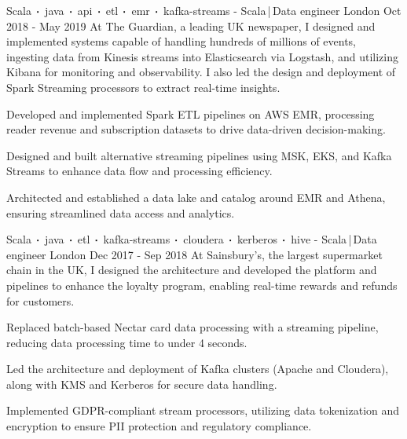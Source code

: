\begin{cventries}
    \cventry
    {Scala$\sqbig$java$\sqbig$api$\sqbig$etl$\sqbig$emr$\sqbig$kafka-streams}
    { - Scala\,|\,Data engineer}
    {London}
    {Oct 2018 - May 2019}
    {At The Guardian, a leading UK newspaper, I designed and implemented systems capable of handling hundreds of millions of events, ingesting data from Kinesis streams into Elasticsearch via Logstash, and utilizing Kibana for monitoring and observability. I also led the design and deployment of Spark Streaming processors to extract real-time insights.}
    {
        \begin{cvitems}
            \item{Developed and implemented Spark ETL pipelines on AWS EMR, processing reader revenue and subscription datasets to drive data-driven decision-making.}
            \item{Designed and built alternative streaming pipelines using MSK, EKS, and Kafka Streams to enhance data flow and processing efficiency.}
            \item{Architected and established a data lake and catalog around EMR and Athena, ensuring streamlined data access and analytics.}
        \end{cvitems}
    }

    \cventry
    {Scala$\sqbig$java$\sqbig$etl$\sqbig$kafka-streams$\sqbig$cloudera$\sqbig$kerberos$\sqbig$hive}
    { - Scala\,|\,Data engineer}
    {London}
    {Dec 2017 - Sep 2018}
    {At Sainsbury’s, the largest supermarket chain in the UK, I designed the architecture and developed the platform and pipelines to enhance the loyalty program, enabling real-time rewards and refunds for customers.}
    {
        \begin{cvitems}
            \item{Replaced batch-based Nectar card data processing with a streaming pipeline, reducing data processing time to under 4 seconds.}
            \item{Led the architecture and deployment of Kafka clusters (Apache and Cloudera), along with KMS and Kerberos for secure data handling.}
            \item{Implemented GDPR-compliant stream processors, utilizing data tokenization and encryption to ensure PII protection and regulatory compliance.}
        \end{cvitems}
    }


\end{cventries}
